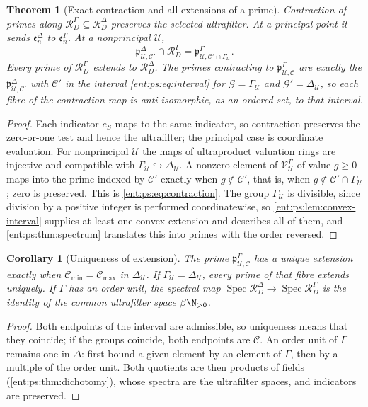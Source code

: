 \documentclass[11pt]{article}
\newtheorem{theorem}{Theorem}[section]
\theoremstyle{plain}
\theoremstyle{plain}
\theoremstyle{plain}
\newtheorem{corollary}[corollary]{Corollary}
\theoremstyle{definition}
\theoremstyle{definition}
\theoremstyle{definition}
\theoremstyle{definition}
\theoremstyle{remark}
\DeclareMathOperator{\Spec}{Spec}\DeclareMathOperator{\red}{red}
\newcommand{\RD}{\mathcal R_D}\newcommand{\Ucal}{\mathcal U}
\begin{document}
\begin{theorem}[Exact contraction and all extensions of a prime]
\label{ent:ps:thm:contraction}
Contraction of primes along $\RD^\Gamma\subseteq\RD^\Delta$ preserves the
selected ultrafilter. At a principal point it sends $\mathfrak e_n^\Delta$ to
$\mathfrak e_n^\Gamma$. At a nonprincipal $\Ucal$,
\begin{equation}\label{ent:ps:eq:contraction}
 \mathfrak p^\Delta_{\Ucal,\mathcal C'}\cap\RD^\Gamma
 =\mathfrak p^\Gamma_{\Ucal,\mathcal C'\cap\Gamma_\Ucal}.
\end{equation}
Every prime of $\RD^\Gamma$ extends to $\RD^\Delta$. The primes contracting
to $\mathfrak p^\Gamma_{\Ucal,\mathcal C}$ are exactly the
$\mathfrak p^\Delta_{\Ucal,\mathcal C'}$ with $\mathcal C'$ in the interval
\eqref{ent:ps:eq:interval} for $\mathcal G=\Gamma_\Ucal$ and
$\mathcal G'=\Delta_\Ucal$, so each fibre of the contraction map is
anti-isomorphic, as an ordered set, to that interval.
\end{theorem}
\begin{proof}
Each indicator $e_S$ maps to the same indicator, so contraction preserves
the zero-or-one test and hence the ultrafilter; the principal case is
coordinate evaluation. For nonprincipal $\Ucal$ the maps of ultraproduct
valuation rings are injective and compatible with
$\Gamma_\Ucal\hookrightarrow\Delta_\Ucal$. A nonzero element of
$\mathcal V_\Ucal^\Gamma$ of value $g\ge0$ maps into the prime indexed by
$\mathcal C'$ exactly when $g\notin\mathcal C'$, that is, when
$g\notin\mathcal C'\cap\Gamma_\Ucal$; zero is preserved. This is
\eqref{ent:ps:eq:contraction}. The group $\Gamma_\Ucal$ is divisible, since
division by a positive integer is performed coordinatewise, so
\cref{ent:ps:lem:convex-interval} supplies at least one convex extension and
describes all of them, and \cref{ent:ps:thm:spectrum} translates this into
primes with the order reversed.
\end{proof}

\begin{corollary}[Uniqueness of extension]\label{ent:ps:cor:unique-extension}
The prime $\mathfrak p^\Gamma_{\Ucal,\mathcal C}$ has a unique extension
exactly when $\mathcal C_{\min}=\mathcal C_{\max}$ in $\Delta_\Ucal$. If
$\Gamma_\Ucal=\Delta_\Ucal$, every prime of that fibre extends uniquely. If
$\Gamma$ has an order unit, the spectral map
$\Spec\RD^\Delta\to\Spec\RD^\Gamma$ is the identity of the common
ultrafilter space $\beta\N_{>0}$.
\end{corollary}
\begin{proof}
Both endpoints of the interval are admissible, so uniqueness means that they
coincide; if the groups coincide, both endpoints are $\mathcal C$. An order
unit of $\Gamma$ remains one in $\Delta$: first bound a given element by an
element of $\Gamma$, then by a multiple of the order unit. Both quotients are
then products of fields (\cref{ent:ps:thm:dichotomy}), whose spectra are the
ultrafilter spaces, and indicators are preserved.
\end{proof}
\end{document}
